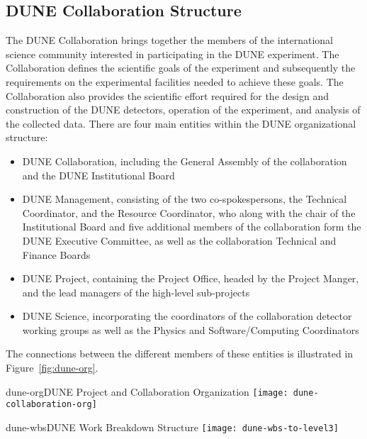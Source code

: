 \subsection{DUNE Collaboration Structure}

The DUNE Collaboration brings together the members of the international science community 
interested in participating in the DUNE experiment.  The Collaboration defines the scientific goals of the experiment and subsequently the requirements on the experimental facilities needed to achieve these goals.  The Collaboration also provides the scientific effort required for the design and construction of the DUNE detectors, operation of the experiment, and analysis of the collected data. There are four main entities within the DUNE organizational structure:  
\begin{itemize}
\item DUNE Collaboration, including the General Assembly of the collaboration and the DUNE Institutional Board     
\item DUNE Management, consisting of the two co-spokespersons, the Technical Coordinator, and the Resource Coordinator, who along with the chair of the Institutional Board and five additional members of the collaboration form the DUNE Executive Committee, as well as the collaboration Technical and Finance Boards 
\item DUNE Project, containing the Project Office, headed by the Project Manger, and the lead managers of the high-level sub-projects 
\item DUNE Science, incorporating the coordinators of the collaboration detector working groups as well as the Physics and Software/Computing Coordinators 
\end{itemize}
The connections between the different members of these entities is illustrated in Figure~\ref{fig:dune-org}.

\begin{cdrfigure}{dune-org}{DUNE Project and Collaboration Organization}
  \texttt{[image: dune-collaboration-org]}
\end{cdrfigure}

\begin{cdrfigure}{dune-wbs}{DUNE Work Breakdown Structure}
  \texttt{[image: dune-wbs-to-level3]}
\end{cdrfigure}

